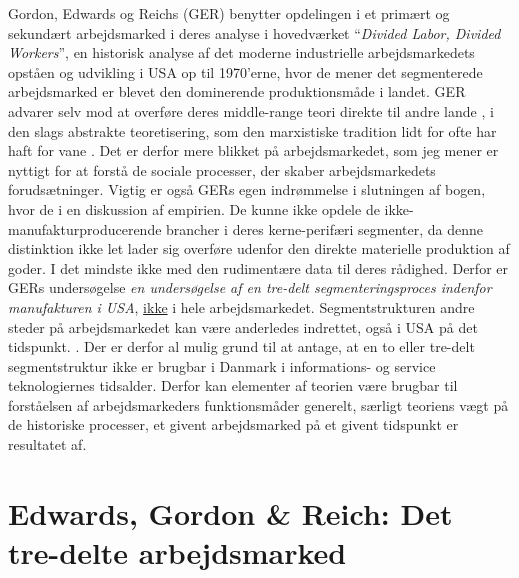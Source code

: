 
Gordon, Edwards og Reichs (GER) benytter opdelingen i et primært og sekundært arbejdsmarked i deres analyse i hovedværket “\emph{Divided Labor, Divided Workers}”, en historisk analyse af det moderne industrielle arbejdsmarkedets opståen og udvikling i USA op til 1970'erne, hvor de mener det segmenterede arbejdsmarked er blevet den dominerende produktionsmåde i landet. GER advarer selv mod at overføre deres middle-range teori direkte til andre lande , i den slags abstrakte teoretisering, som den marxistiske tradition lidt for ofte har haft for vane \parencite[21]{Gordon1982}. Det er derfor mere blikket på arbejdsmarkedet, som jeg mener er nyttigt for at forstå de sociale processer, der skaber arbejdsmarkedets forudsætninger. Vigtig er også GERs egen indrømmelse i slutningen af bogen, hvor de i en diskussion af empirien. De kunne ikke opdele de ikke-manufakturproducerende brancher i deres kerne-perifæri segmenter, da denne distinktion ikke let lader sig overføre udenfor den direkte materielle produktion af goder. I det mindste ikke med den rudimentære data til deres rådighed. Derfor er GERs undersøgelse \emph{en undersøgelse af en tre-delt segmenteringsproces indenfor manufakturen i USA}, \underline{ikke} i hele arbejdsmarkedet. Segmentstrukturen andre steder på arbejdsmarkedet kan være anderledes indrettet, også i USA på det tidspunkt. \parencite[199]{Gordon1982}. Der er derfor al mulig grund til at antage, at en to eller tre-delt segmentstruktur ikke er brugbar i Danmark i informations- og service teknologiernes tidsalder.  Derfor kan elementer af teorien være brugbar til forståelsen af arbejdsmarkeders funktionsmåder generelt, særligt teoriens vægt på de historiske processer, et givent arbejdsmarked på et givent tidspunkt er resultatet af.

\section{Edwards, Gordon \& Reich: Det tre-delte arbejdsmarked \label{sec_teori_AST_GER}}


